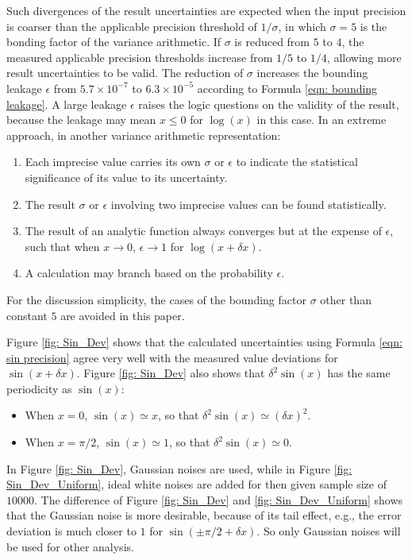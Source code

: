 \documentclass[twoside]{article}
\numberwithin{equation}{section}
\begin{document}
Such divergences of the result uncertainties are expected when the input precision is coarser than the applicable precision threshold of $1/\sigma$, in which $\sigma=5$ is the bonding factor  of the variance arithmetic.
If $\sigma$ is reduced from $5$ to $4$, the measured applicable precision thresholds increase from $1/5$ to $1/4$, allowing more result uncertainties to be valid.
The reduction of $\sigma$ increases the bounding leakage $\epsilon$ from $5.7 \times 10^{-7}$ to $6.3 \times 10^{-5}$ according to Formula \eqref{eqn: bounding leakage}.
A large leakage $\epsilon$ raises the logic questions on the validity of the result, because the leakage may mean $x \leq 0$ for $\log(x)$ in this case.
In an extreme approach, in another variance arithmetic representation:
\begin{enumerate}

\item Each imprecise value carries its own $\sigma$ or $\epsilon$ to indicate the statistical significance of its value to its uncertainty.

\item The result $\sigma$ or $\epsilon$ involving two imprecise values can be found statistically.

\item The result of an analytic function always converges but at the expense of $\epsilon$, such that  when $x \rightarrow 0$, $\epsilon \rightarrow 1$ for $\log(x + \delta x)$. 

\item A calculation may branch based on the probability $\epsilon$.

\end{enumerate}
For the discussion simplicity, the cases of the bounding factor $\sigma$ other than constant $5$ are avoided in this paper.

Figure \ref{fig: Sin_Dev} shows that the calculated uncertainties using Formula \eqref{eqn: sin precision} agree very well with the measured value deviations for $\sin(x + \delta x)$.
Figure \ref{fig: Sin_Dev} also shows that $\delta^2 \sin(x)$ has the same periodicity as $\sin(x)$:
\begin{itemize}
\item When $x=0$, $\sin(x) \simeq x$, so that $\delta^2 \sin(x) \simeq (\delta x)^2$.
\item When $x=\pi/2$, $\sin(x) \simeq 1$, so that $\delta^2 \sin(x) \simeq 0$.
\end{itemize}

In Figure \ref{fig: Sin_Dev}, Gaussian noises are used, while in Figure \ref{fig: Sin_Dev_Uniform}, ideal white noises are added for then given sample size of $10000$.
The difference of Figure \ref{fig: Sin_Dev} and \ref{fig: Sin_Dev_Uniform} shows that the Gaussian noise is more desirable, because of its tail effect, e.g., the error deviation is much closer to $1$ for $\sin(\pm \pi/2 + \delta x)$.
So only Gaussian noises will be used for other analysis.
\end{document}
